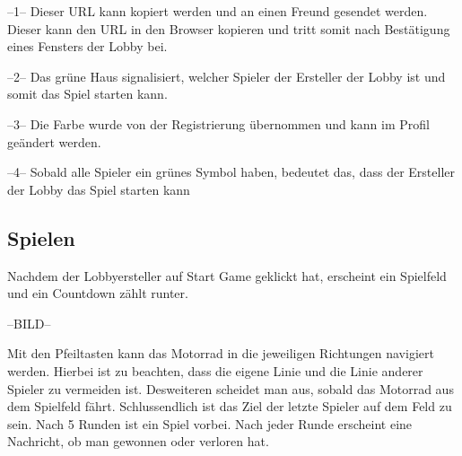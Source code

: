 \documentclass[11pt,ngerman]{article}
\begin{document}
    
    --1-- Dieser URL kann kopiert werden und an einen Freund gesendet werden. Dieser kann den URL in den Browser kopieren und tritt somit nach Bestätigung eines Fensters der Lobby bei.
    
    --2-- Das grüne Haus signalisiert, welcher Spieler der Ersteller der Lobby ist und somit das Spiel starten kann.
    
    --3-- Die Farbe wurde von der Registrierung übernommen und kann im Profil geändert werden.
    
    --4-- Sobald alle Spieler ein grünes Symbol haben, bedeutet das, dass der Ersteller der Lobby das Spiel starten kann
    
    \subsection{Spielen}
    
    Nachdem der Lobbyersteller auf Start Game geklickt hat, erscheint ein Spielfeld und ein Countdown zählt runter.
    
    --BILD--
    
    Mit den Pfeiltasten kann das Motorrad in die jeweiligen Richtungen navigiert werden. 
    Hierbei ist zu beachten, dass die eigene Linie und die Linie anderer Spieler zu vermeiden ist. Desweiteren scheidet man aus, sobald das Motorrad aus dem Spielfeld fährt. 
    Schlussendlich ist das Ziel der letzte Spieler auf dem Feld zu sein. Nach 5 Runden ist ein Spiel vorbei. Nach jeder Runde erscheint eine Nachricht, ob man gewonnen oder verloren hat.
   
    
\end{document}
